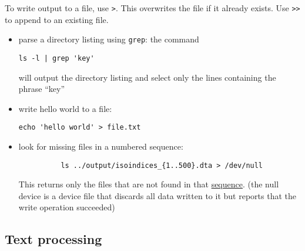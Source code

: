To write output to a file, use \texttt{>}.
This overwrites the file if it already exists.
Use \texttt{>>} to append to an existing file.


\begin{itemize}
	\item parse a directory listing using \texttt{grep}: the command 
	\begin{verbatim}ls -l | grep 'key'\end{verbatim}
	will output the directory listing and select only the lines containing the phrase ``key''
	\item write hello world to a file:
	\begin{verbatim}echo 'hello world' > file.txt\end{verbatim}
	\item look for missing files in a numbered sequence:
		  \begin{verbatim}
		  ls ../output/isoindices_{1..500}.dta > /dev/null
		  \end{verbatim}
		  This returns only the files that are not found in that \href{http://www.thelinuxrain.com/articles/building-sequences-of-numbers-on-the-command-line}{sequence}.
		  (the null device is a device file that discards all data written to it but reports that the write operation succeeded)
\end{itemize}

\subsection{Text processing}

